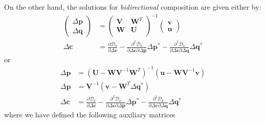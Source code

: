 On the other hand, the solutions for \emph{bidirectional} composition are given either by:
\begin{equation}
    \begin{aligned}
        \begin{pmatrix}
            \Delta\mathbf{p}
            \\
            \Delta\mathbf{q}
        \end{pmatrix} & =
        \begin{pmatrix}
            \mathbf{V} & \mathbf{W}^T
            \\
            \mathbf{W} & \mathbf{U}
            \\
        \end{pmatrix}^{-1}
        \begin{pmatrix}
            \mathbf{v}
            \\
            \mathbf{u}
        \end{pmatrix}
        \\
        \Delta \mathbf{c} & = \frac{\partial \mathcal{D}_b}{\partial \Delta \mathbf{c}} - \frac{\partial^2 \mathcal{D}_b}{\partial \Delta \mathbf{c} \partial \Delta \mathbf{p}} \Delta \mathbf{p}^* - \frac{\partial^2 \mathcal{D}_b}{\partial \Delta \mathbf{c} \partial \Delta \mathbf{q}} \Delta \mathbf{q}^*
    \label{eq:bidirectional_newton_schur_solutions1}
    \end{aligned}
\end{equation}
or
\begin{equation}
    \begin{aligned}
        \Delta \mathbf{p} & = \left( \mathbf{U} - \mathbf{W} \mathbf{V}^{-1} \mathbf{W}^T \right)^{-1} \left(\mathbf{u} -  \mathbf{W} \mathbf{V}^{-1}\mathbf{v} \right)
    	\\
        \Delta \mathbf{p} & = \mathbf{V}^{-1} \left( \mathbf{v} - \mathbf{W}^T \Delta\mathbf{q}^*\right)
    	\\
        \Delta \mathbf{c} & = \frac{\partial \mathcal{D}_b}{\partial \Delta \mathbf{c}} - \frac{\partial^2 \mathcal{D}_b}{\partial \Delta \mathbf{c} \partial \Delta \mathbf{p}} \Delta \mathbf{p}^* - \frac{\partial^2 \mathcal{D}_b}{\partial \Delta \mathbf{c} \partial \Delta \mathbf{q}} \Delta \mathbf{q}^*
    \label{eq:bidirectional_newton_schur_solutions2}
    \end{aligned}
\end{equation}
where we have defined the following auxiliary matrices
